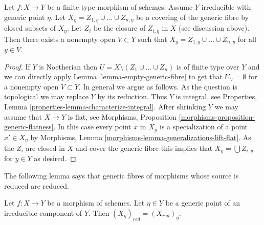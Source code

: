 \begin{lemma}
\label{lemma-cover-generic-fibre-neighbourhood}
Let $f : X \to Y$ be a finite type morphism of schemes. Assume
$Y$ irreducible with generic point $\eta$. Let
$X_\eta = Z_{1, \eta} \cup \ldots \cup Z_{n, \eta}$ be a covering of
the generic fibre by closed subsets of $X_\eta$.
Let $Z_i$ be the closure of $Z_{i, \eta}$ in $X$ (see discussion above).
Then there exists a nonempty open $V \subset Y$ such
that $X_y = Z_{1, y} \cup \ldots \cup Z_{n, y}$ for all $y \in V$.
\end{lemma}

\begin{proof}
If $Y$ is Noetherian then $U = X \setminus (Z_1 \cup \ldots \cup Z_n)$
is of finite type over $Y$ and we can directly apply
Lemma \ref{lemma-empty-generic-fibre}
to get that $U_V = \emptyset$ for a nonempty open $V \subset Y$.
In general we argue as follows. As the question is topological
we may replace $Y$ by its reduction. Thus $Y$ is integral, see
Properties, Lemma \ref{properties-lemma-characterize-integral}.
After shrinking $Y$ we may assume that $X \to Y$ is flat, see
Morphisms, Proposition \ref{morphisms-proposition-generic-flatness}.
In this case every point $x$ in $X_y$ is a specialization of a point
$x' \in X_\eta$ by
Morphisms, Lemma \ref{morphisms-lemma-generalizations-lift-flat}.
As the $Z_i$ are closed in $X$ and cover the generic fibre this
implies that $X_y = \bigcup Z_{i, y}$ for $y \in Y$ as desired.
\end{proof}

\noindent
The following lemma says that generic fibres of morphisms whose source is
reduced are reduced.

\begin{lemma}
\label{lemma-reduction-generic-fibre}
Let $f : X \to Y$ be a morphism of schemes. Let $\eta \in Y$ be a generic
point of an irreducible component of $Y$. Then
$(X_\eta)_{red} = (X_{red})_\eta$.
\end{lemma}

